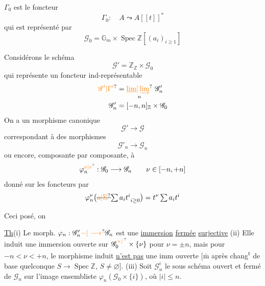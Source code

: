  $\Gamma_0$ est le foncteur
\[
\Gamma_0:\quad A\leadsto A[[t]]^{*}
\]
qui est représenté par
\[
\mathscr G_0=\mathbb G_m\times\operatorname{Spec}\mathbb Z[(a_i)_{i\geq1}]
\]

Considérons le schéma
\[
\mathscr G'=\mathbb Z_{\mathbb Z}\times\mathscr G_0
\]
qui représente un foncteur ind-représentable
\[
\begin{aligned}
\unsure{\mathscr G'|\Gamma'}&=\underset{n}{\unsure{\underline{\lim}|\varinjlim}}\ \mathscr G'_n\\
\mathscr G'_n&=[-n,n]_{\mathbb Z}\times\mathscr G_0
\end{aligned}
\]
On a un morphisme canonique
\[
\mathscr G'\longrightarrow\mathscr G
\]
correspondant à des morphismes
\[
\mathscr G'_n\longrightarrow\mathscr G_n
\]
 ou encore, composante par composante, à
\[
\varphi_n^{\unsure{\nu|v}}:\mathscr G_0\longrightarrow\mathscr G_n
\qquad \nu\in[-n,+n]
\]
donné  sur les foncteurs par
\[
\varphi_n^\nu\bigl(\deleted{\unsure{a|\Sigma}}{\textstyle\sum a_i t^i}_{i\geq0}\bigr)
=t^\nu\textstyle\sum a_i t^i
\]

Ceci posé, on 

\uline{Th}\quad (i) Le morph. $\varphi_n:\mathscr G'_n\unsure{\mathord{-}|\longrightarrow}\mathscr G_n$ est une \uline{immersion} \uline{fermée} \uline{surjective}
(ii) Elle induit une immersion ouverte sur $\mathscr G_0^{\unsure{\times|\,}} \times\{\nu\}$ pour $\nu=\pm n$, mais pour $-n<\nu<+n$, le morphisme induit \uline{n'est pas} une imm ouverte [$\bar{\mathrm m}$ après chang\textsuperscript{t} de base quelconque $S\longrightarrow\operatorname{Spec}\mathbb Z$, $S\ne\varnothing$].
(iii) Soit $\mathscr G_n^i$ le sous schéma ouvert  et fermé de $\mathscr G_n$  sur l'image ensembliste $\varphi_n(\mathscr G_0\times\{i\})$, où $|i|\leq n$.

